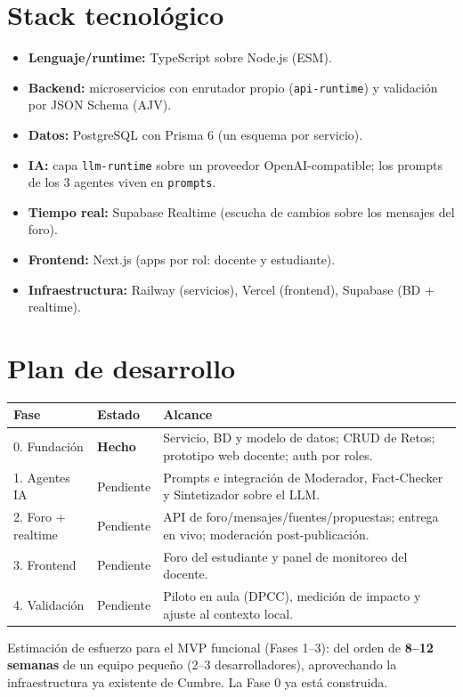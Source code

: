 \documentclass[11pt,a4paper]{article}
\begin{document}
\section{Stack tecnol\'ogico}
\begin{itemize}[leftmargin=*]
  \item \textbf{Lenguaje/runtime:} TypeScript sobre Node.js (ESM).
  \item \textbf{Backend:} microservicios con enrutador propio (\texttt{api-runtime}) y validaci\'on por JSON Schema (AJV).
  \item \textbf{Datos:} PostgreSQL con Prisma 6 (un esquema por servicio).
  \item \textbf{IA:} capa \texttt{llm-runtime} sobre un proveedor OpenAI-compatible; los prompts de los 3 agentes viven en \texttt{prompts}.
  \item \textbf{Tiempo real:} Supabase Realtime (escucha de cambios sobre los mensajes del foro).
  \item \textbf{Frontend:} Next.js (apps por rol: docente y estudiante).
  \item \textbf{Infraestructura:} Railway (servicios), Vercel (frontend), Supabase (BD + realtime).
\end{itemize}

\section{Plan de desarrollo}
\begin{tabularx}{\textwidth}{@{}l l X@{}}
\toprule
\textbf{Fase} & \textbf{Estado} & \textbf{Alcance} \\
\midrule
0. Fundaci\'on & \textbf{Hecho} & Servicio, BD y modelo de datos; CRUD de Retos; prototipo web docente; auth por roles. \\
1. Agentes IA & Pendiente & Prompts e integraci\'on de Moderador, Fact-Checker y Sintetizador sobre el LLM. \\
2. Foro + realtime & Pendiente & API de foro/mensajes/fuentes/propuestas; entrega en vivo; moderaci\'on post-publicaci\'on. \\
3. Frontend & Pendiente & Foro del estudiante y panel de monitoreo del docente. \\
4. Validaci\'on & Pendiente & Piloto en aula (DPCC), medici\'on de impacto y ajuste al contexto local. \\
\bottomrule
\end{tabularx}

\medskip
\noindent Estimaci\'on de esfuerzo para el MVP funcional (Fases 1--3): del orden de \textbf{8--12 semanas} de un equipo peque\~no (2--3 desarrolladores), aprovechando la infraestructura ya existente de Cumbre. La Fase 0 ya est\'a construida.
\end{document}
